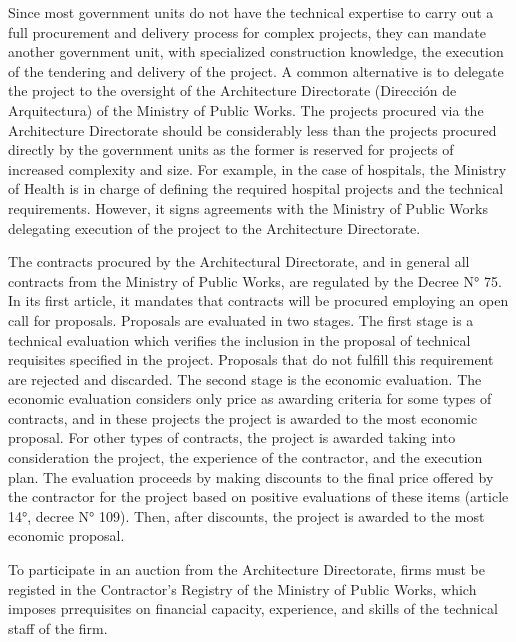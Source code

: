 \begin{enumerate}[wide, labelwidth=!,labelindent=0pt,label=\textbf{\arabic*}.]
Since most government units do not have the technical expertise to carry out a full procurement and delivery process for complex projects, they can mandate another government unit, with specialized construction knowledge, the execution of the tendering and delivery of the project. A common alternative is to delegate the project to the oversight of the Architecture Directorate (Dirección de Arquitectura) of the Ministry of Public Works. The projects procured via the Architecture Directorate should be considerably less than the projects procured directly by the government units as the former is reserved for projects of increased complexity and size.  For example, in the case of hospitals, the Ministry of Health is in charge of defining the required hospital projects and the technical requirements. However, it signs agreements with the Ministry of Public Works delegating execution of the project to the Architecture Directorate.

The contracts procured by the Architectural Directorate, and in general all contracts from the Ministry of Public Works, are regulated by the Decree N° 75. In its first article, it mandates that contracts will be procured employing an open call for proposals. Proposals are evaluated in two stages. The first stage is a technical evaluation which verifies the inclusion in the proposal of technical requisites specified in the project. Proposals that do not fulfill this requirement are rejected and discarded. The second stage is the economic evaluation. The economic evaluation considers only price as awarding criteria for some types of contracts, and in these projects the project is awarded to the most economic proposal. For other types of contracts, the project is awarded taking into consideration the project, the experience of the contractor, and the execution plan. The evaluation proceeds by making discounts to the final price offered by the contractor for the project based on positive evaluations of these items (article 14°, decree N° 109). Then, after discounts, the project is awarded to the most economic proposal.

To participate in an auction from the Architecture Directorate, firms must be registed in the Contractor's Registry of the Ministry of Public Works, which imposes prrequisites on financial capacity, experience, and skills of the technical staff of the firm.

\end{enumerate}

